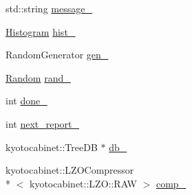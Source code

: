 \begin{DoxyCompactItemize}
std\-::string \hyperlink{classleveldb_1_1_benchmark_aea491ad3eeaa61dab1a3dd4e2b55265a}{message\-\_\-}
\item 
\hyperlink{classleveldb_1_1_histogram}{Histogram} \hyperlink{classleveldb_1_1_benchmark_ab874c6e3492347d1287f711d82d87fd5}{hist\-\_\-}
\item 
Random\-Generator \hyperlink{classleveldb_1_1_benchmark_a988990f038394e3e20b68c9276b8f954}{gen\-\_\-}
\item 
\hyperlink{classleveldb_1_1_random}{Random} \hyperlink{classleveldb_1_1_benchmark_a86331cf7ff255c11dc1142fad198023f}{rand\-\_\-}
\item 
int \hyperlink{classleveldb_1_1_benchmark_a435c05829486b521db35dbe88f9085f3}{done\-\_\-}
\item 
int \hyperlink{classleveldb_1_1_benchmark_ade1416947e54bb1497240c9b69e24e72}{next\-\_\-report\-\_\-}
\item 
kyotocabinet\-::\-Tree\-D\-B $\ast$ \hyperlink{classleveldb_1_1_benchmark_ac287bb1d708f5e4859ef6633f3769a0c}{db\-\_\-}
\item 
kyotocabinet\-::\-L\-Z\-O\-Compressor\\*
$<$ kyotocabinet\-::\-L\-Z\-O\-::\-R\-A\-W $>$ \hyperlink{classleveldb_1_1_benchmark_aa81b0851626974e65e302735393c937d}{comp\-\_\-}
\end{DoxyCompactItemize}


